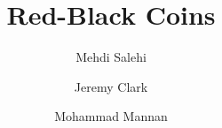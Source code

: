 \documentclass[envcountsect]{llncs}
\begin{document}
\frontmatter
\mainmatter

\title{\Large \bf Red-Black Coins}

\author{
Mehdi Salehi \and
Jeremy Clark \and
Mohammad Mannan
}


\maketitle
















\clearpage
\appendix
\end{document}
